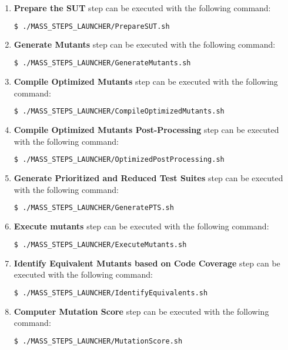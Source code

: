 \begin{enumerate}
	\item \textbf{Prepare the SUT} step can be executed with the following command:

	\begin{lstlisting}[language=bash]
	  $ ./MASS_STEPS_LAUNCHER/PrepareSUT.sh
\end{lstlisting}

	\item \textbf{Generate Mutants} step can be executed with the following command:

	\begin{lstlisting}[language=bash]
	  $ ./MASS_STEPS_LAUNCHER/GenerateMutants.sh
\end{lstlisting}

	\item \textbf{Compile Optimized Mutants} step can be executed with the following command:

	\begin{lstlisting}[language=bash]
	  $ ./MASS_STEPS_LAUNCHER/CompileOptimizedMutants.sh
\end{lstlisting}

	\item \textbf{Compile Optimized Mutants Post-Processing} step can be executed with the following command:

	\begin{lstlisting}[language=bash]
	  $ ./MASS_STEPS_LAUNCHER/OptimizedPostProcessing.sh
\end{lstlisting}

	\item \textbf{Generate Prioritized and Reduced Test Suites} step can be executed with the following command:

	\begin{lstlisting}[language=bash]
	  $ ./MASS_STEPS_LAUNCHER/GeneratePTS.sh
\end{lstlisting}

	\item \textbf{Execute mutants} step can be executed with the following command:

	\begin{lstlisting}[language=bash]
	  $ ./MASS_STEPS_LAUNCHER/ExecuteMutants.sh
\end{lstlisting}

	\item \textbf{Identify Equivalent Mutants based on Code Coverage} step can be executed with the following command:

	\begin{lstlisting}[language=bash]
	  $ ./MASS_STEPS_LAUNCHER/IdentifyEquivalents.sh
\end{lstlisting}

	\item \textbf{Computer Mutation Score} step can be executed with the following command:

	\begin{lstlisting}[language=bash]
	  $ ./MASS_STEPS_LAUNCHER/MutationScore.sh
\end{lstlisting} 
\end{enumerate}


